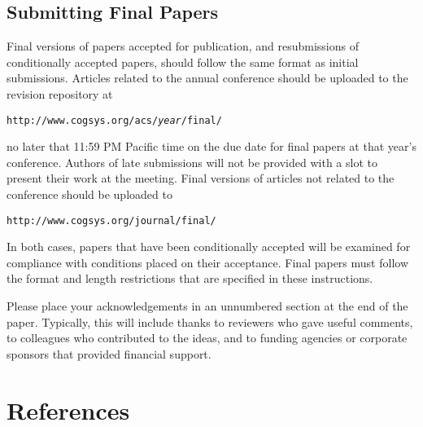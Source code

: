 \documentclass[11pt,letterpaper]{article}
\begin{document}

\subsection{Submitting Final Papers}

Final versions of papers accepted for publication, and resubmissions 
of conditionally accepted papers, should follow the same format 
as initial submissions. Articles related to the annual conference
should be uploaded to the revision repository at
\vskip 0.13in
\begin{small}
\centerline{{\tt http://www.cogsys.org/acs/{\it year\/}/final/}}
\end{small}
\vskip 0.12in
\noindent
no later that 11:59 PM Pacific time on the due date for final papers
at that year's conference. Authors of late submissions will not be
provided with a slot to present their work at the meeting. Final 
versions of articles not related to the conference should be uploaded
to
\vskip 0.13in
\begin{small}
\centerline{{\tt http://www.cogsys.org/journal/final/}}
\end{small}
\vskip 0.12in
\noindent
In both cases, papers that have been conditionally accepted will be
examined for compliance with conditions placed on their acceptance. 
Final papers must follow the format and length restrictions that are
specified in these instructions.

\newpage
 
\begin{acknowledgements} 
\noindent
Please place your acknowledgements in an unnumbered section at the
end of the paper. Typically, this will include thanks to reviewers
who gave useful comments, to colleagues who contributed to the ideas, 
and to funding agencies or corporate sponsors that provided financial 
support.
\end{acknowledgements} 

\section*{References}
\end{document}
